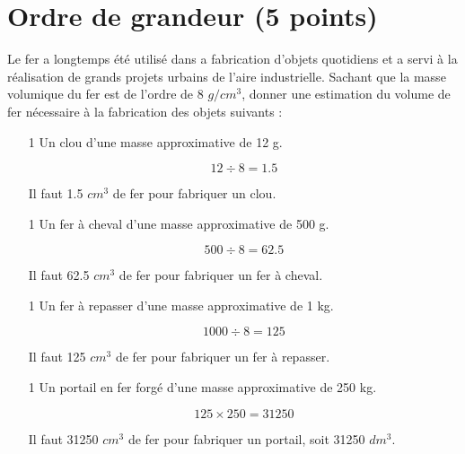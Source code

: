 \section{Ordre de grandeur (5 points)}\label{ex:grandeur}

Le fer a longtemps été utilisé dans a fabrication d'objets quotidiens et a servi à la réalisation de grands projets urbains de l'aire industrielle. Sachant que la masse volumique du fer est de l'ordre de 8 $g/cm^3$, donner une estimation du volume de fer nécessaire à la fabrication des objets suivants :

\begin{enumerate}
	\item[1] Un clou d'une masse approximative de 12 g.
	
	\begin{solution}
		\begin{equation}
			12 \div 8 = 1.5
		\end{equation}
		
		Il faut \num{1.5} $cm^3$ de fer pour fabriquer un clou.
	\end{solution}
	
	\item[1] Un fer à cheval d'une masse approximative de 500 g.
	\begin{solution}
		\begin{equation}
			500 \div 8 = \num{62.5}
		\end{equation}
		
		Il faut \num{62.5} $cm^3$ de fer pour fabriquer un fer à cheval.
	\end{solution}

	\item[1] Un fer à repasser d'une masse approximative de 1 kg.
	\begin{solution}
		\begin{equation}
			1000 \div 8 = \num{125}
		\end{equation}
		
		Il faut \num{125} $cm^3$ de fer pour fabriquer un fer à repasser.
	\end{solution}

	\item[1] Un portail en fer forgé d'une masse approximative de 250 kg.
	\begin{solution}
		\begin{equation}
			125 \times 250 = \num{31250}
		\end{equation}
		
		Il faut \num{31250} $cm^3$ de fer pour fabriquer un portail, soit \num{31250} $dm^3$.
	\end{solution}


\end{enumerate}

